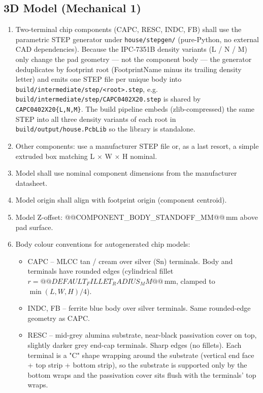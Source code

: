 \documentclass[11pt,a4paper]{article}
\begin{document}
\subsection{3D Model (Mechanical 1)}

\begin{enumerate}[nosep]
  \item Two-terminal chip components (CAPC, RESC, INDC, FB) shall use the parametric STEP generator under \texttt{house/stepgen/} (pure-Python, no external CAD dependencies). Because the IPC-7351B density variants (L / N / M) only change the pad geometry --- not the component body --- the generator deduplicates by footprint root (FootprintName minus its trailing density letter) and emits one STEP file per unique body into \texttt{build/intermediate/step/<root>.step}, e.g. \texttt{build/intermediate/step/CAPC0402X20.step} is shared by \texttt{CAPC0402X20\{L,N,M\}}. The build pipeline embeds (zlib-compressed) the same STEP into all three density variants of each root in \texttt{build/output/house.PcbLib} so the library is standalone.
  \item Other components: use a manufacturer STEP file or, as a last resort, a simple extruded box matching L $\times$ W $\times$ H nominal.
  \item Model shall use nominal component dimensions from the manufacturer datasheet.
  \item Model origin shall align with footprint origin (component centroid).
  \item Model Z-offset: @@COMPONENT_BODY_STANDOFF_MM@@\,mm above pad surface.
  \item Body colour conventions for autogenerated chip models:
    \begin{itemize}[nosep]
      \item CAPC -- MLCC tan / cream over silver (Sn) terminals. Body and terminals have rounded edges (cylindrical fillet $r = @@DEFAULT_FILLET_RADIUS_MM@@$\,mm, clamped to $\min(L,W,H)/4$).
      \item INDC, FB -- ferrite blue body over silver terminals. Same rounded-edge geometry as CAPC.
      \item RESC -- mid-grey alumina substrate, near-black passivation cover on top, slightly darker grey end-cap terminals. Sharp edges (no fillets). Each terminal is a "C" shape wrapping around the substrate (vertical end face + top strip + bottom strip), so the substrate is supported only by the bottom wraps and the passivation cover sits flush with the terminals' top wraps.
    \end{itemize}
\end{enumerate}
\end{document}
